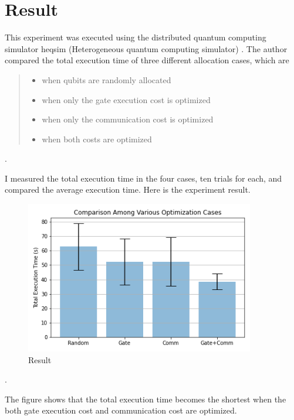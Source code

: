 \newpage
\section{Result}
This experiment was executed using the distributed quantum computing simulator heqsim (Heterogeneous quantum computing simulator) \cite{heqsim}. The author compared the total execution time of three different allocation cases, which are 
 
 \begin{quote}
 \begin{itemize}
  \item when qubits are randomly allocated
  \item when only the gate execution cost is optimized
  \item when only the communication cost is optimized
  \item when both costs are optimized
 \end{itemize}
\end{quote}.

I measured the total execution time in the four cases, ten trials for each, and compared the average execution time.  Here is the experiment result.

  \begin{figure}[h]
  		\begin{center}
  			\includegraphics[width=10cm]{img/first_experiment_plot.png}
			\caption{Result}
		\end{center}
\end{figure}.

The figure shows that the total execution time becomes the shortest when the both gate execution cost and communication cost are optimized.
 
